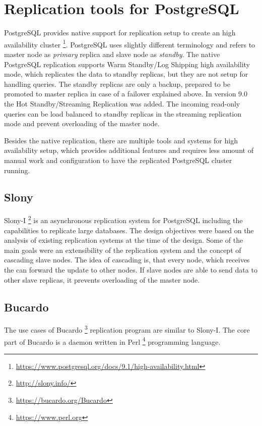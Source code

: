 \documentclass[
  digital, %
  twoside, %
  table,   %
  lof,     %
  lot,     %
]{fithesis3}
\begin{document}
\section{Replication tools for PostgreSQL} \label{sec:pg_replication}
PostgreSQL provides native support for replication setup to create an high availability cluster \footnote{\url{https://www.postgresql.org/docs/9.1/high-availability.html}}. PostgreSQL uses slightly different terminology and refers to master node as \textit{primary} replica and slave node as \textit{standby}. The native PostgreSQL replication supports Warm Standby/Log Shipping high availability mode, which replicates the data to standby replicas, but they are not setup for handling queries. The standby replicas are only a backup, prepared to be promoted to master replica in case of a failover explained above. In version 9.0 the Hot Standby/Streaming Replication was added. The incoming read-only queries can be load balanced to standby replicas in the streaming replication mode and prevent overloading of the master node.

Besides the native replication, there are multiple tools and systems for high availability setup, which provides additional features and requires less amount of manual work and configuration to have the replicated PostgreSQL cluster running.

\subsection{Slony}
Slony-I \footnote{\url{http://slony.info/}} is an asynchronous replication system for PostgreSQL including the capabilities to replicate large databases. The design objectives were based on the analysis of existing replication systems at the time of the design. Some of the main goals were an extensibility of the replication system and the concept of cascading slave nodes. The idea of cascading is, that every node, which receives the can forward the update to other nodes. If slave nodes are able to send data to other slave replicas, it prevents overloading of the master node.

\subsection{Bucardo}
The use cases of Bucardo \footnote{\url{https://bucardo.org/Bucardo}} replication program are similar to Slony-I. The core part of Bucardo is a daemon written in Perl \footnote{\url{https://www.perl.org}} programming language.
\end{document}
